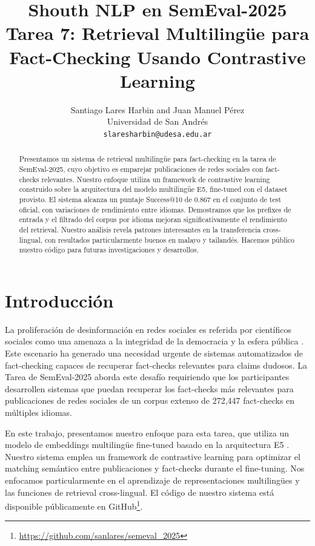 \documentclass[11pt]{article}
\title{Shouth NLP en SemEval-2025 Tarea 7: Retrieval Multilingüe para Fact-Checking Usando Contrastive Learning}
\author{}
\author{Santiago Lares Harbin and Juan Manuel Pérez \\
  Universidad de San Andrés \\
  \texttt{slaresharbin@udesa.edu.ar}}
\begin{document}
\maketitle
\begin{abstract}
Presentamos un sistema de retrieval multilingüe para fact-checking en la tarea de SemEval-2025, cuyo objetivo es emparejar publicaciones de redes sociales con fact-checks relevantes. Nuestro enfoque utiliza un framework de contrastive learning construido sobre la arquitectura del modelo multilingüe E5, fine-tuned con el dataset provisto. El sistema alcanza un puntaje Success@10 de 0.867 en el conjunto de test oficial, con variaciones de rendimiento entre idiomas. Demostramos que los prefixes de entrada y el filtrado del corpus por idioma mejoran significativamente el rendimiento del retrieval. Nuestro análisis revela patrones interesantes en la transferencia cross-lingual, con resultados particularmente buenos en malayo y tailandés. Hacemos público nuestro código para futuras investigaciones y desarrollos.
\end{abstract}

\section{Introducción}
La proliferación de desinformación en redes sociales es referida por científicos sociales como una amenaza a la integridad de la democracia y la esfera pública \cite{chambers2021truth, lewandowsky2023misinformation}.
Este escenario ha generado una necesidad urgente de sistemas automatizados de fact-checking capaces de recuperar fact-checks relevantes para claims dudosos. La Tarea de SemEval-2025 \cite{sebi2025multilingual} aborda este desafío requiriendo que los participantes desarrollen sistemas que puedan recuperar los fact-checks más relevantes para publicaciones de redes sociales de un corpus extenso de 272,447 fact-checks en múltiples idiomas.

En este trabajo, presentamos nuestro enfoque para esta tarea, que utiliza un modelo de embeddings multilingüe fine-tuned basado en la arquitectura E5 \cite{wang2024multilingual}. Nuestro sistema emplea un framework de contrastive learning para optimizar el matching semántico entre publicaciones y fact-checks durante el fine-tuning. Nos enfocamos particularmente en el aprendizaje de representaciones multilingües y las funciones de retrieval cross-lingual. El código de nuestro sistema está disponible públicamente en GitHub\footnote{\url{https://github.com/sanlares/semeval_2025}}.
\end{document}
